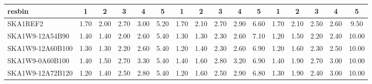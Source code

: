 \begin{table}[H]
{{\begin{tabular}{|lccccc||ccccc||ccccc|}
 resbin  &1 & 2 & 3 & 4 & 5 & 1 & 2 & 3 & 4 & 5 & 1 & 2 & 3 & 4 & 5 \\ \hline
SKA1REF2 & 1.70 \cellcolor{blue!60.00} & 2.00 \cellcolor{red!60.00} & 2.70 \cellcolor{green!60.00} & 3.00 \cellcolor{orange!42.00} & 5.20 \cellcolor{purple!18.00} & 1.70 \cellcolor{blue!60.00} & 2.10 \cellcolor{red!60.00} & 2.70 \cellcolor{green!51.60} & 2.90 \cellcolor{orange!39.00} & 6.60 \cellcolor{purple!18.00} & 1.70 \cellcolor{blue!60.00} & 2.10 \cellcolor{red!60.00} & 2.50 \cellcolor{green!43.20} & 2.60 \cellcolor{orange!28.50} & 9.50 \cellcolor{purple!18.00}\\ \hline 
SKA1W9-12A54B90 & 1.40 \cellcolor{blue!34.80} & 1.40 \cellcolor{red!24.00} & 2.00 \cellcolor{green!18.00} & 2.60 \cellcolor{orange!18.00} & 5.40 \cellcolor{purple!60.00} & 1.30 \cellcolor{blue!26.40} & 1.30 \cellcolor{red!18.00} & 2.30 \cellcolor{green!18.00} & 2.60 \cellcolor{orange!18.00} & 7.10 \cellcolor{purple!60.00} & 1.20 \cellcolor{blue!18.00} & 1.50 \cellcolor{red!18.00} & 2.20 \cellcolor{green!18.00} & 2.40 \cellcolor{orange!18.00} & 10.00 \cellcolor{purple!60.00}\\ \hline 
SKA1W9-12A60B100 & 1.30 \cellcolor{blue!26.40} & 1.30 \cellcolor{red!18.00} & 2.20 \cellcolor{green!30.00} & 2.60 \cellcolor{orange!18.00} & 5.40 \cellcolor{purple!60.00} & 1.20 \cellcolor{blue!18.00} & 1.40 \cellcolor{red!23.25} & 2.30 \cellcolor{green!18.00} & 2.60 \cellcolor{orange!18.00} & 6.90 \cellcolor{purple!43.20} & 1.20 \cellcolor{blue!18.00} & 1.60 \cellcolor{red!25.00} & 2.30 \cellcolor{green!26.40} & 2.50 \cellcolor{orange!23.25} & 10.00 \cellcolor{purple!60.00}\\ \hline 
SKA1W9-0A60B100 & 1.40 \cellcolor{blue!34.80} & 1.50 \cellcolor{red!30.00} & 2.70 \cellcolor{green!60.00} & 3.30 \cellcolor{orange!60.00} & 5.40 \cellcolor{purple!60.00} & 1.40 \cellcolor{blue!34.80} & 1.60 \cellcolor{red!33.75} & 2.80 \cellcolor{green!60.00} & 3.20 \cellcolor{orange!60.00} & 6.90 \cellcolor{purple!43.20} & 1.40 \cellcolor{blue!34.80} & 1.90 \cellcolor{red!46.00} & 2.70 \cellcolor{green!60.00} & 3.00 \cellcolor{orange!49.50} & 10.00 \cellcolor{purple!60.00}\\ \hline 
SKA1W9-12A72B120 & 1.20 \cellcolor{blue!18.00} & 1.40 \cellcolor{red!24.00} & 2.50 \cellcolor{green!48.00} & 2.80 \cellcolor{orange!30.00} & 5.40 \cellcolor{purple!60.00} & 1.20 \cellcolor{blue!18.00} & 1.60 \cellcolor{red!33.75} & 2.50 \cellcolor{green!34.80} & 2.90 \cellcolor{orange!39.00} & 6.80 \cellcolor{purple!34.80} & 1.30 \cellcolor{blue!26.40} & 1.90 \cellcolor{red!46.00} & 2.40 \cellcolor{green!34.80} & 3.00 \cellcolor{orange!49.50} & 10.00 \cellcolor{purple!60.00}\\ \hline 

\end{tabular}}}
\end{table}
